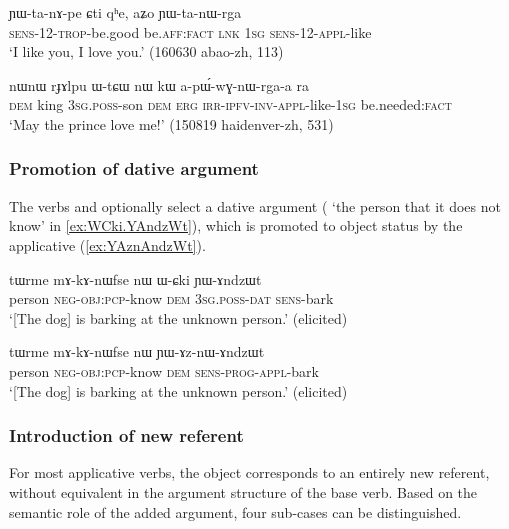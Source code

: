 \begin{exe}
\ex \label{ex:YWtanWrga}
\gll ɲɯ-ta-nɤ-pe ɕti qʰe, aʑo ɲɯ-ta-nɯ-rga \\
\textsc{sens}-1\fl{}2-\textsc{trop}-be.good be.\textsc{aff}:\textsc{fact} \textsc{lnk} \textsc{1sg} \textsc{sens}-1\fl{}2-\textsc{appl}-like \\
\glt `I like you, I love you.' (160630 abao-zh, 113)
\end{exe}

\begin{exe}
\ex \label{ex:apWwGnWrgaa}
\gll nɯnɯ rɟɤlpu ɯ-tɕɯ nɯ kɯ a-pɯ́-wɣ-nɯ-rga-a ra \\
\textsc{dem} king \textsc{3sg}.\textsc{poss}-son \textsc{dem} \textsc{erg} \textsc{irr}-\textsc{ipfv}-\textsc{inv}-\textsc{appl}-like-\textsc{1sg} be.needed:\textsc{fact} \\
\glt `May the prince love me!' (150819 haidenver-zh, 531)
\end{exe}

\subsubsection{Promotion of dative argument} \label{sec:applicative.dative}
The verbs  and  optionally select a dative argument ( `the person that it does not know' in \ref{ex:WCki.YAndzWt}), which is promoted to object status by the applicative (\ref{ex:YAznAndzWt}).

\begin{exe}
\ex \label{ex:WCki.YAndzWt}
\gll tɯrme mɤ-kɤ-nɯfse nɯ ɯ-ɕki ɲɯ-ɤndzɯt \\
person \textsc{neg}-\textsc{obj}:\textsc{pcp}-know \textsc{dem} \textsc{3sg}.\textsc{poss}-\textsc{dat} \textsc{sens}-bark \\
\glt `[The dog] is barking at the unknown person.' (elicited)
\end{exe}

\begin{exe}
\ex \label{ex:YAznAndzWt}
\gll tɯrme mɤ-kɤ-nɯfse nɯ ɲɯ-ɤz-nɯ-ɤndzɯt \\
person \textsc{neg}-\textsc{obj}:\textsc{pcp}-know \textsc{dem} \textsc{sens}-\textsc{prog}-\textsc{appl}-bark \\
\glt `[The dog] is barking at the unknown person.' (elicited)
\end{exe}

\subsubsection{Introduction of new referent}
For most applicative verbs, the object corresponds to an entirely new referent, without equivalent in the argument structure of the base verb. Based on the semantic role of the added argument, four sub-cases can be distinguished.

